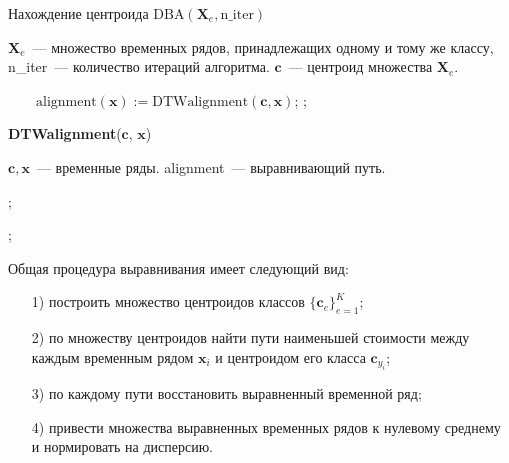 \begin{algorithm}
	\caption{Нахождение центроида $\text{DBA}(\mathbf{X}_e, \text{n\_iter})$}
	\label{DBA_pseudo}
	\begin{algorithmic}[1]
		\REQUIRE $\mathbf{X}_e$~--- множество временных рядов, принадлежащих одному и тому же классу, n\_iter~--- количество итераций алгоритма.
		\ENSURE $\mathbf{c}$~--- центроид множества $\mathbf{X}_e$.
		
		\STATEx $ \quad \quad \text{alignment}(\mathbf{x}) := \text{DTWalignment}(\mathbf{c}, \mathbf{x})$;
		\ENDFOR
		;
		\ENDFOR
	\end{algorithmic}

	\textbf{DTWalignment}($\mathbf{c}$, $\mathbf{x}$)
	\begin{algorithmic}[1]
		\REQUIRE $\mathbf{c}, \mathbf{x}$~--- временные ряды.
		\ENSURE alignment~--- выравнивающий путь.
		
		;
		
		;
	\end{algorithmic}
\end{algorithm}
\newpage
Общая процедура выравнивания имеет следующий вид:
\begin{itemize}
	\item[1)]
	построить множество центроидов классов $\{\mathbf{c}_e\}_{e = 1}^K$;
	\item[2)]
	по множеству центроидов найти пути наименьшей стоимости между каждым
	временным рядом $\mathbf{x}_i$ и центроидом его класса $\mathbf{c}_{y_i}$;
	\item[3)]
	по каждому пути восстановить выравненный временной ряд;
	\item[4)]
	привести множества выравненных временных рядов к нулевому среднему и нормировать на дисперсию.
\end{itemize}

